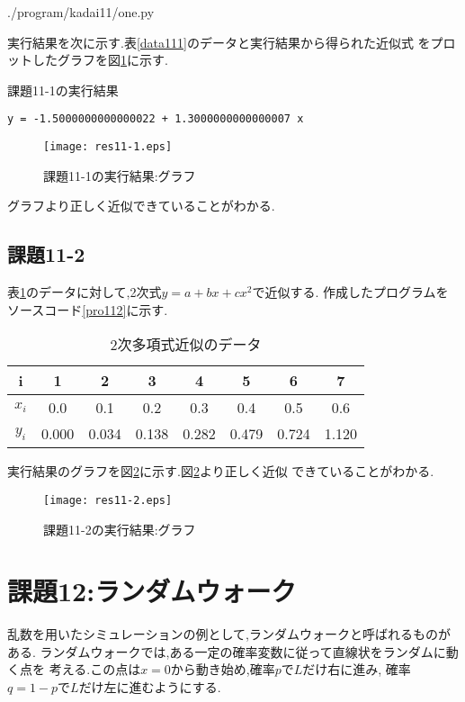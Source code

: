 \documentclass[a4j]{jsarticle}
\begin{document}

{./program/kadai11/one.py}

実行結果を次に示す.表\ref{data111}のデータと実行結果から得られた近似式
をプロットしたグラフを図\ref{graph11-1}に示す.
\begin{breakitembox}[l]{課題11-1の実行結果}
\begin{verbatim}
y = -1.5000000000000022 + 1.3000000000000007 x		
\end{verbatim}
\end{breakitembox}

\begin{figure}[htbp]
 \centering
 \texttt{[image: res11-1.eps]}
 \caption{課題11-1の実行結果:グラフ}
 \label{graph11-1}
\end{figure}

グラフより正しく近似できていることがわかる.

\subsection{課題11-2}
表\ref{data112}のデータに対して,2次式$y=a+bx+cx^2$で近似する.
作成したプログラムをソースコード\ref{pro112}に示す.
\begin{table}[H]
\centering
\caption{2次多項式近似のデータ}
\label{data112}
 \begin{tabular}{|c||c|c|c|c|c|c|c|}
  \hline
  i&1&2&3&4&5&6&7\\
  \hline
  \hline
  $x_i$&0.0&0.1&0.2&0.3&0.4&0.5&0.6\\
  \hline
  $y_i$&0.000&0.034&0.138&0.282&0.479&0.724&1.120\\
  \hline
 \end{tabular}
\end{table}



実行結果のグラフを図\ref{graph11-2}に示す.図\ref{graph11-2}より正しく近似
できていることがわかる.
\begin{figure}[htbp]
 \centering
 \texttt{[image: res11-2.eps]}
 \caption{課題11-2の実行結果:グラフ}
 \label{graph11-2}
\end{figure}

\section{課題12:ランダムウォーク}
乱数を用いたシミュレーションの例として,ランダムウォークと呼ばれるものがある.
ランダムウォークでは,ある一定の確率変数に従って直線状をランダムに動く点を
考える.この点は$x=0$から動き始め,確率$p$で$L$だけ右に進み,
確率$q=1-p$で$L$だけ左に進むようにする.
\end{document}
